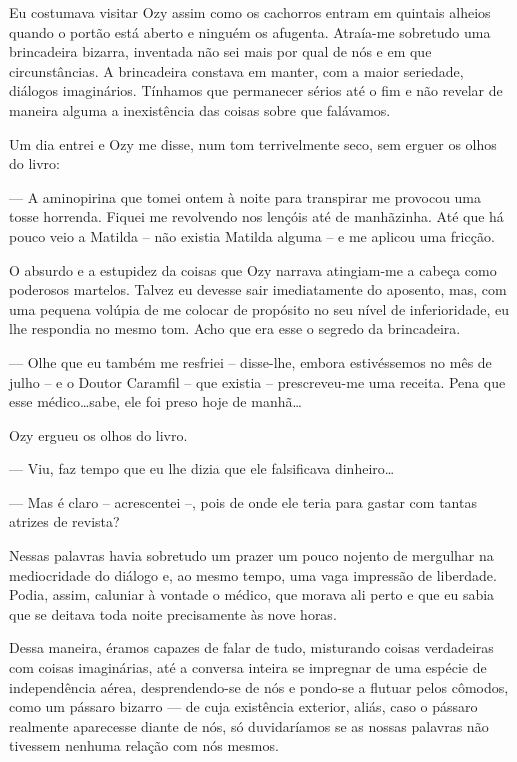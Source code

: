 Eu costumava visitar Ozy assim como os cachorros entram em quintais alheios quando o portão está aberto e ninguém os afugenta. Atraía-me sobretudo uma brincadeira bizarra, inventada não sei mais por qual de nós e em que circunstâncias. A brincadeira constava em manter, com a maior seriedade, diálogos imaginários. Tínhamos que permanecer sérios até o fim e não revelar de maneira alguma a inexistência das coisas sobre que falávamos.

Um dia entrei e Ozy me disse, num tom terrivelmente seco, sem erguer os olhos do livro:

--- A aminopirina que tomei ontem à noite para transpirar me provocou uma tosse horrenda. Fiquei me revolvendo nos lençóis até de manhãzinha. Até que há pouco veio a Matilda -- não existia Matilda alguma -- e me aplicou uma fricção.

O absurdo e a estupidez da coisas que Ozy narrava atingiam-me a cabeça como poderosos martelos. Talvez eu devesse sair imediatamente do aposento, mas, com uma pequena volúpia de me colocar de propósito no seu nível de inferioridade, eu lhe respondia no mesmo tom. Acho que era esse o segredo da brincadeira.

--- Olhe que eu também me resfriei -- disse-lhe, embora estivéssemos no mês de julho -- e o Doutor Caramfil -- que existia -- prescreveu-me uma receita. Pena que esse médico\dots sabe, ele foi preso hoje de manhã\dots

Ozy ergueu os olhos do livro.

--- Viu, faz tempo que eu lhe dizia que ele falsificava dinheiro\dots

--- Mas é claro -- acrescentei --, pois de onde ele teria para gastar com tantas atrizes de revista?

Nessas palavras havia sobretudo um prazer um pouco nojento de mergulhar na mediocridade do diálogo e, ao mesmo tempo, uma vaga impressão de liberdade. Podia, assim, caluniar à vontade o médico, que morava ali perto e que eu sabia que se deitava toda noite precisamente às nove horas. 

Dessa maneira, éramos capazes de falar de tudo, misturando coisas verdadeiras com coisas imaginárias, até a conversa inteira se impregnar de uma espécie de independência aérea, desprendendo-se de nós e pondo-se a flutuar pelos cômodos, como um pássaro bizarro --- de cuja existência exterior, aliás, caso o pássaro realmente aparecesse diante de nós, só duvidaríamos se as nossas palavras não tivessem nenhuma relação com nós mesmos.

